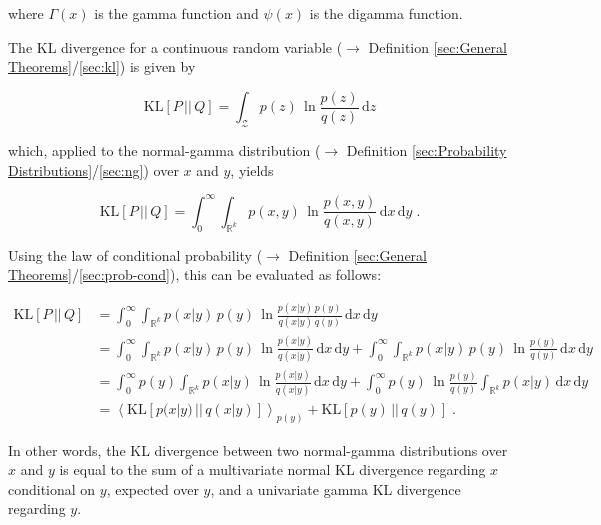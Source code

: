 \documentclass[a4paper,12pt,twoside]{book}
\begin{document}
where $\Gamma(x)$ is the gamma function and $\psi(x)$ is the digamma function.

\vspace{1em}
The KL divergence for a continuous random variable ($\rightarrow$ Definition \ref{sec:General Theorems}/\ref{sec:kl}) is given by 

\begin{equation} \label{eq:ng-kl-KL-cont}
\mathrm{KL}[P\,||\,Q] = \int_{\mathcal{Z}} p(z) \, \ln \frac{p(z)}{q(z)} \, \mathrm{d}z
\end{equation}

which, applied to the normal-gamma distribution ($\rightarrow$ Definition \ref{sec:Probability Distributions}/\ref{sec:ng}) over $x$ and $y$, yields

\begin{equation} \label{eq:ng-kl-NG-KL0}
\mathrm{KL}[P\,||\,Q] = \int_{0}^{\infty} \int_{\mathbb{R}^k} p(x,y) \, \ln \frac{p(x,y)}{q(x,y)} \, \mathrm{d}x \, \mathrm{d}y \; .
\end{equation}

Using the law of conditional probability ($\rightarrow$ Definition \ref{sec:General Theorems}/\ref{sec:prob-cond}), this can be evaluated as follows:

\begin{equation} \label{eq:ng-kl-NG-KL1}
\begin{split}
\mathrm{KL}[P\,||\,Q] &= \int_{0}^{\infty} \int_{\mathbb{R}^k} p(x|y) \, p(y) \, \ln \frac{p(x|y) \, p(y)}{q(x|y) \, q(y)} \, \mathrm{d}x \, \mathrm{d}y \\
&= \int_{0}^{\infty} \int_{\mathbb{R}^k} p(x|y)\, p(y) \, \ln \frac{p(x|y)}{q(x|y)} \, \mathrm{d}x \, \mathrm{d}y + \int_{0}^{\infty} \int_{\mathbb{R}^k} p(x|y)\, p(y) \, \ln \frac{p(y)}{q(y)} \, \mathrm{d}x \, \mathrm{d}y \\
&= \int_{0}^{\infty} p(y) \int_{\mathbb{R}^k} p(x|y) \, \ln \frac{p(x|y)}{q(x|y)} \, \mathrm{d}x \, \mathrm{d}y + \int_{0}^{\infty} p(y) \, \ln \frac{p(y)}{q(y)} \int_{\mathbb{R}^k} p(x|y) \, \mathrm{d}x \, \mathrm{d}y \\
&= \left\langle \mathrm{KL}[p(x|y)\,||\,q(x|y)] \right\rangle_{p(y)} + \mathrm{KL}[p(y)\,||\,q(y)] \; .
\end{split}
\end{equation}

In other words, the KL divergence between two normal-gamma distributions over $x$ and $y$ is equal to the sum of a multivariate normal KL divergence regarding $x$ conditional on $y$, expected over $y$, and a univariate gamma KL divergence regarding $y$.
\end{document}
